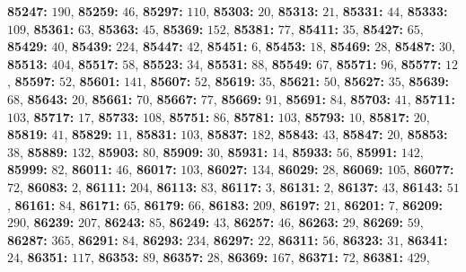 \textsf{\bfseries 85247:} $190$, \textsf{\bfseries 85259:} $46$, \textsf{\bfseries 85297:} $110$, \textsf{\bfseries 85303:} $20$, \textsf{\bfseries 85313:} $21$, \textsf{\bfseries 85331:} $44$, \textsf{\bfseries 85333:} $109$, \textsf{\bfseries 85361:} $63$, \textsf{\bfseries 85363:} $45$, \textsf{\bfseries 85369:} $152$, \textsf{\bfseries 85381:} $77$, \textsf{\bfseries 85411:} $35$, \textsf{\bfseries 85427:} $65$, \textsf{\bfseries 85429:} $40$, \textsf{\bfseries 85439:} $224$, \textsf{\bfseries 85447:} $42$, \textsf{\bfseries 85451:} $6$, \textsf{\bfseries 85453:} $18$, \textsf{\bfseries 85469:} $28$, \textsf{\bfseries 85487:} $30$, \textsf{\bfseries 85513:} $404$, \textsf{\bfseries 85517:} $58$, \textsf{\bfseries 85523:} $34$, \textsf{\bfseries 85531:} $88$, \textsf{\bfseries 85549:} $67$, \textsf{\bfseries 85571:} $96$, \textsf{\bfseries 85577:} $12$, \textsf{\bfseries 85597:} $52$, \textsf{\bfseries 85601:} $141$, \textsf{\bfseries 85607:} $52$, \textsf{\bfseries 85619:} $35$, \textsf{\bfseries 85621:} $50$, \textsf{\bfseries 85627:} $35$, \textsf{\bfseries 85639:} $68$, \textsf{\bfseries 85643:} $20$, \textsf{\bfseries 85661:} $70$, \textsf{\bfseries 85667:} $77$, \textsf{\bfseries 85669:} $91$, \textsf{\bfseries 85691:} $84$, \textsf{\bfseries 85703:} $41$, \textsf{\bfseries 85711:} $103$, \textsf{\bfseries 85717:} $17$, \textsf{\bfseries 85733:} $108$, \textsf{\bfseries 85751:} $86$, \textsf{\bfseries 85781:} $103$, \textsf{\bfseries 85793:} $10$, \textsf{\bfseries 85817:} $20$, \textsf{\bfseries 85819:} $41$, \textsf{\bfseries 85829:} $11$, \textsf{\bfseries 85831:} $103$, \textsf{\bfseries 85837:} $182$, \textsf{\bfseries 85843:} $43$, \textsf{\bfseries 85847:} $20$, \textsf{\bfseries 85853:} $38$, \textsf{\bfseries 85889:} $132$, \textsf{\bfseries 85903:} $80$, \textsf{\bfseries 85909:} $30$, \textsf{\bfseries 85931:} $14$, \textsf{\bfseries 85933:} $56$, \textsf{\bfseries 85991:} $142$, \textsf{\bfseries 85999:} $82$, \textsf{\bfseries 86011:} $46$, \textsf{\bfseries 86017:} $103$, \textsf{\bfseries 86027:} $134$, \textsf{\bfseries 86029:} $28$, \textsf{\bfseries 86069:} $105$, \textsf{\bfseries 86077:} $72$, \textsf{\bfseries 86083:} $2$, \textsf{\bfseries 86111:} $204$, \textsf{\bfseries 86113:} $83$, \textsf{\bfseries 86117:} $3$, \textsf{\bfseries 86131:} $2$, \textsf{\bfseries 86137:} $43$, \textsf{\bfseries 86143:} $51$, \textsf{\bfseries 86161:} $84$, \textsf{\bfseries 86171:} $65$, \textsf{\bfseries 86179:} $66$, \textsf{\bfseries 86183:} $209$, \textsf{\bfseries 86197:} $21$, \textsf{\bfseries 86201:} $7$, \textsf{\bfseries 86209:} $290$, \textsf{\bfseries 86239:} $207$, \textsf{\bfseries 86243:} $85$, \textsf{\bfseries 86249:} $43$, \textsf{\bfseries 86257:} $46$, \textsf{\bfseries 86263:} $29$, \textsf{\bfseries 86269:} $59$, \textsf{\bfseries 86287:} $365$, \textsf{\bfseries 86291:} $84$, \textsf{\bfseries 86293:} $234$, \textsf{\bfseries 86297:} $22$, \textsf{\bfseries 86311:} $56$, \textsf{\bfseries 86323:} $31$, \textsf{\bfseries 86341:} $24$, \textsf{\bfseries 86351:} $117$, \textsf{\bfseries 86353:} $89$, \textsf{\bfseries 86357:} $28$, \textsf{\bfseries 86369:} $167$, \textsf{\bfseries 86371:} $72$, \textsf{\bfseries 86381:} $429$, 

